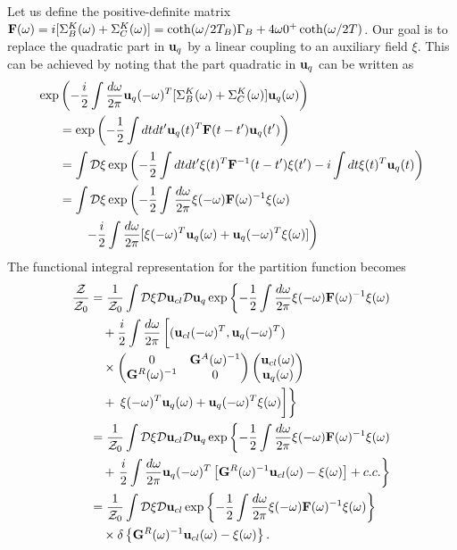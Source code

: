 Let us define the positive-definite matrix $\mathbf{F}(\omega)=i[\Sigma_B^K(\omega)+\Sigma_C^K(\omega)] = \coth(\omega/2T_B) \Gamma_B + 4\omega 0^+ \coth(\omega/2T)$. Our goal is to replace the quadratic part in $\mathbf{u}_q$ by a linear coupling to an auxiliary field $\xi$. This can be achieved by noting that the part quadratic in $\mathbf{u}_q$ can be written as
\begin{alignat}{2}
 \exp &\left(-\frac{i}{2} \int \frac{d\omega}{2\pi} \mathbf{u}_q(-\omega)^T [\Sigma^K_B(\omega)+ \Sigma_C^K(\omega)] \mathbf{u}_q(\omega) \right) \notag  \\
  &= \exp \left(- \frac{1}{2} \int dt dt' \mathbf{u}_q(t)^T \mathbf{F}(t-t') \mathbf{u}_{q}(t') \right) \\
  &= \int \mathcal{D}\xi \exp\left(- \frac{1}{2} \int dt dt' \xi(t)^T \mathbf{F}^{-1}(t-t') \xi(t') - i \int dt \xi(t)^T \mathbf{u}_q(t) \right) \\
  &= \int \mathcal{D}\xi \exp\left(- \frac{1}{2} \int \frac{d\omega}{2\pi} \xi(-\omega) \mathbf{F}(\omega)^{-1} \xi(\omega) \right. \notag \\
  &\qquad \left. - \frac{i}{2} \int \frac{d\omega}{2\pi} [\xi(-\omega)^T\mathbf{u}_q(\omega)+\mathbf{u}_q(-\omega)^T\xi(\omega)] \right)
\end{alignat}
The functional integral representation for the partition function becomes 
\begin{alignat}{2}
 \frac{\mathcal{Z}}{\mathcal{Z}_0}&= \frac{1}{\mathcal{Z}_0}\int \mathcal{D}\xi\mathcal{D}\mathbf{u}_{cl}\mathcal{D}\mathbf{u}_q \exp\left\{- \frac{1}{2} \int \frac{d\omega}{2\pi} \xi(-\omega) \mathbf{F}(\omega)^{-1} \xi(\omega) \right. \notag  \\
  & \quad + \frac{i}{2} \int \frac{d\omega}{2\pi} \left[ (\mathbf{u}_{cl}(-\omega)^T,\mathbf{u}_q(-\omega)^T)\phantom{\int}  \right.   \notag \\
  & \quad \times \left(\begin{matrix}
   0 & \mathbf{G}^A(\omega)^{-1} \\ 
   \mathbf{G}^R(\omega)^{-1}   & 0\\
  \end{matrix} \right)\left(\begin{matrix}
  \mathbf{u}_{cl}(\omega) \\ \mathbf{u}_{q}(\omega)
 \end{matrix}
 \right) \notag \\
  &\quad + \left. \left.\vphantom{\int} \xi(-\omega)^T\mathbf{u}_q(\omega)+\mathbf{u}_q(-\omega)^T\xi(\omega) \right] \right\} \\
  &= \frac{1}{\mathcal{Z}_0}\int \mathcal{D}\xi\mathcal{D}\mathbf{u}_{cl}\mathcal{D}\mathbf{u}_q \exp\left\{- \frac{1}{2} \int \frac{d\omega}{2\pi} \xi(-\omega) \mathbf{F}(\omega)^{-1} \xi(\omega) \right. \notag \\
  & \quad + \left.\frac{i}{2} \int \frac{d\omega}{2\pi} \mathbf{u}_q(-\omega)^T\left[\mathbf{G}^R(\omega)^{-1}\mathbf{u}_{cl}(\omega)-\xi(\omega)\right]+c.c. \right\} \\
  &= \frac{1}{\mathcal{Z}_0}\int \mathcal{D}\xi\mathcal{D}\mathbf{u}_{cl} \exp\left\{- \frac{1}{2} \int \frac{d\omega}{2\pi} \xi(-\omega) \mathbf{F}(\omega)^{-1} \xi(\omega)\right\} \notag \\
  &\quad  \times \delta\left\{\mathbf{G}^R(\omega)^{-1}\mathbf{u}_{cl}(\omega)-\xi(\omega)\right\}.
\end{alignat}
